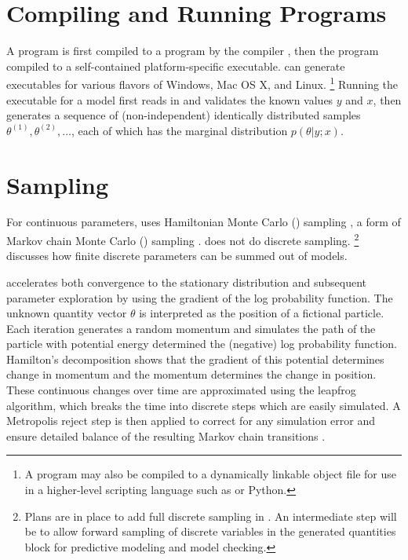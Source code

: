 \section{Compiling and Running \Stan Programs}

A \Stan program is first compiled to a \Cpp program by the \Stan
compiler \stanc, then the \Cpp program compiled to a self-contained
platform-specific executable.  \Stan can generate executables for
various flavors of Windows, Mac OS X, and Linux.%
%
\footnote{A \Stan program may also be compiled to a dynamically
  linkable object file for use in a higher-level scripting language
  such as \R or Python.}
%
Running the \Stan executable for a model first reads in and validates
the known values $y$ and $x$, then generates a sequence of
(non-independent) identically distributed samples $\theta^{(1)},
\theta^{(2)}, \ldots$, each of which has the marginal distribution
$p(\theta|y;x)$.


\section{Sampling}

For continuous parameters, \Stan uses Hamiltonian Monte Carlo (\HMC)
sampling \citep{Duane:1987, Neal:1994, Neal:2011}, a form of Markov chain Monte
Carlo (\MCMC) sampling \citep{Metropolis:1953}.   does not do
discrete sampling.%
%
\footnote{Plans are in place to add full discrete sampling in .  An intermediate step will be to allow forward sampling of
  discrete variables in the generated quantities block for predictive
  modeling and model checking.}
%
 discusses how finite discrete parameters
can be summed out of models.

\HMC accelerates both convergence to the stationary distribution and
subsequent parameter exploration by using the gradient of the log
probability function.  The unknown quantity vector $\theta$ is
interpreted as the position of a fictional particle.  Each iteration
generates a random momentum and simulates the path of the particle
with potential energy determined the (negative) log probability
function.  Hamilton's decomposition shows that the gradient of this
potential determines change in momentum and the momentum determines
the change in position.  These continuous changes over time are
approximated using the leapfrog algorithm, which breaks the time into
discrete steps which are easily simulated.  A Metropolis reject step
is then applied to correct for any simulation error and ensure
detailed balance of the resulting Markov chain transitions
\citep{Metropolis:1953, Hastings:1970}.


